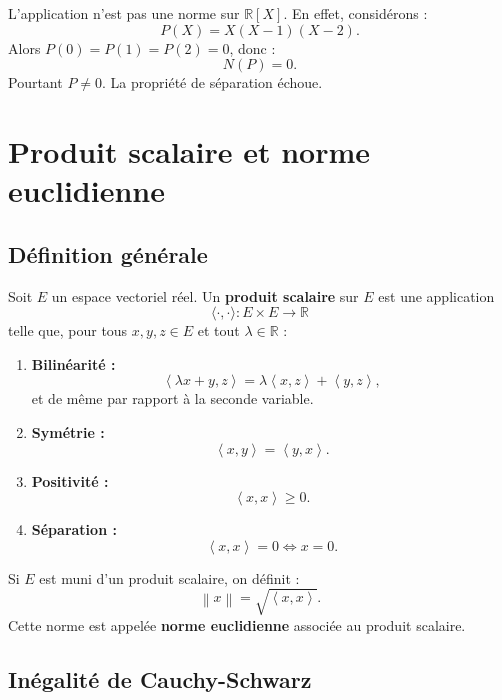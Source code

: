 \documentclass[11pt,a4paper]{article}
\newcommand{\R}{\mathbb R}
\newcommand{\norme}[1]{\left\lVert #1 \right\rVert}
\newcommand{\scal}[2]{\left\langle #1,#2\right\rangle}
\begin{document}
\begin{correctionbox}[3]
L'application n'est pas une norme sur \(\R[X]\).  
En effet, considérons :
\[
P(X)=X(X-1)(X-2).
\]
Alors \(P(0)=P(1)=P(2)=0\), donc :
\[
N(P)=0.
\]
Pourtant \(P\neq 0\).  
La propriété de séparation échoue.
\end{correctionbox}

\section{Produit scalaire et norme euclidienne}

\subsection{Définition générale}

\begin{definitionbox}
Soit \(E\) un espace vectoriel réel.  
Un \textbf{produit scalaire} sur \(E\) est une application
\[
\langle\cdot,\cdot\rangle:E\times E\to\R
\]
telle que, pour tous \(x,y,z\in E\) et tout \(\lambda\in\R\) :

\begin{enumerate}
    \item \textbf{Bilinéarité :}
    \[
    \scal{\lambda x+y}{z}=\lambda\scal{x}{z}+\scal{y}{z},
    \]
    et de même par rapport à la seconde variable.
    \item \textbf{Symétrie :}
    \[
    \scal{x}{y}=\scal{y}{x}.
    \]
    \item \textbf{Positivité :}
    \[
    \scal{x}{x}\geq 0.
    \]
    \item \textbf{Séparation :}
    \[
    \scal{x}{x}=0\Longleftrightarrow x=0.
    \]
\end{enumerate}
\end{definitionbox}

\begin{definitionbox}
Si \(E\) est muni d'un produit scalaire, on définit :
\[
\norme{x}=\sqrt{\scal{x}{x}}.
\]
Cette norme est appelée \textbf{norme euclidienne} associée au produit scalaire.
\end{definitionbox}

\subsection{Inégalité de Cauchy-Schwarz}
\end{document}
